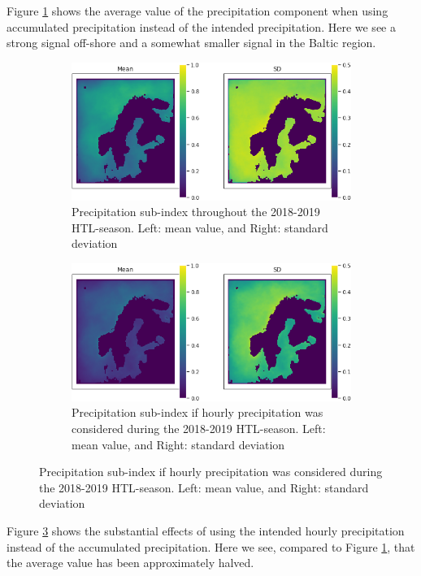 Figure \ref{fig:precipitationmeps} shows the average value of the precipitation component when using accumulated precipitation instead of the intended precipitation. Here we see a strong signal off-shore and a somewhat smaller signal in the Baltic region. 

\begin{figure}
    \centering
    \begin{subfigure}{\textwidth}
    \includegraphics[width = \textwidth]{Figures/P.png}
    \caption{Precipitation sub-index throughout the 2018-2019 HTL-season. Left: mean value, and Right: standard deviation}
    \label{fig:precipitationmeps}
    \end{subfigure}
    
    \begin{subfigure}{\textwidth}
    \includegraphics[width = \textwidth]{Figures/Pf.png}
    \caption{Precipitation sub-index if hourly precipitation was considered during the 2018-2019 HTL-season. Left: mean value, and Right: standard deviation}
    \label{fig:precipitationfixmeps}
    \end{subfigure}
\end{figure}

Figure \ref{fig:precipitationfixmeps} shows the substantial effects of using the intended hourly precipitation instead of the accumulated precipitation. Here we see, compared to Figure \ref{fig:precipitationmeps}, that the average value has been approximately halved.

